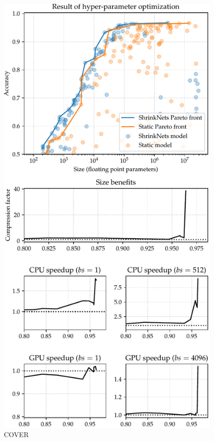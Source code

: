 \begin{figure}
\begin{center}
\includegraphics[width=\columnwidth]{COVER_FC_summary}
\vspace*{-5mm}
\caption{COVER}
\end{center}
\vspace*{-4mm}
\end{figure}

